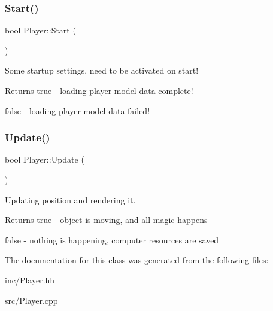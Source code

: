 \subsubsection{\texorpdfstring{Start()}{Start()}}
{\footnotesize\ttfamily bool Player\+::\+Start (\begin{DoxyParamCaption}{ }\end{DoxyParamCaption})}



Some startup settings, need to be activated on start! 

\begin{DoxyReturn}{Returns}
true -\/ loading player model data complete! 

false -\/ loading player model data failed! 
\end{DoxyReturn}
\mbox{\label{class_player_a91f887a024035be5030aa4b3384705fa}} 
\subsubsection{\texorpdfstring{Update()}{Update()}}
{\footnotesize\ttfamily bool Player\+::\+Update (\begin{DoxyParamCaption}{ }\end{DoxyParamCaption})}



Updating position and rendering it. 

\begin{DoxyReturn}{Returns}
true -\/ object is moving, and all magic happens 

false -\/ nothing is happening, computer resources are saved 
\end{DoxyReturn}


The documentation for this class was generated from the following files\+:\begin{DoxyCompactItemize}
\item 
inc/Player.\+hh\item 
src/Player.\+cpp\end{DoxyCompactItemize}
